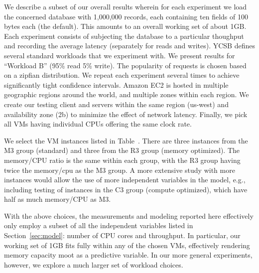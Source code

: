 


We describe a subset of our overall results wherein for each experiment %
we load the concerned database with 1,000,000 records, each containing ten fields of 100 bytes each (the default). This amounts to an overall working set of about 1GB. Each experiment consists of subjecting the database to a particular thoughput and recording the average latency (separately for reads and writes). YCSB defines several standard workloads that we experiment with. We present results for ``Workload B'' (95\% read 5\% write). The popularity of requests is chosen based on a zipfian distribution. We repeat each experiment several times to achieve significantly tight confidence intervals. 
Amazon EC2 is hosted in multiple geographic regions around the world, and multiple zones within each region.  We create our testing client and servers within the same region (us-west) and availability zone (2b) to minimize the effect of network latency. Finally, we pick all VMs having individual CPUs offering the same clock rate. 

We select the VM instances listed in Table~\label{table:awstypes}.  
There are three instances from the M3 group (standard) and three from the R3 group (memory optimized).  The memory/CPU ratio is the same within each group, with the R3 group having twice the memory/cpu as the M3 group.  A more extensive study with more instances would allow the use of more independent variables in the model, e.g., including testing of instances in the C3 group (compute optimized), which have half as much memory/CPU as M3.

With the above choices, the measurements and modeling reported here effectively only employ a subset of all the independent variables listed in Section~\ref{sec:model}: number of CPU cores and throughput. In particular, our working set of 1GB fits fully within any of the chosen VMs, effectively rendering memory capacity moot as a predictive variable. In our more general experiments, however, we explore a much larger set of workload choices. 

